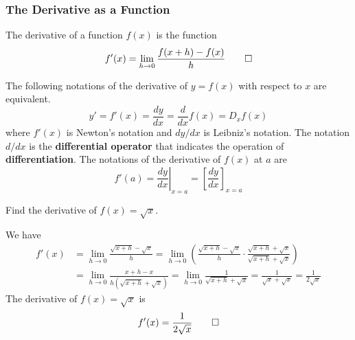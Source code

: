 \subsubsection{The Derivative as a Function}
\begin{definition}
    The derivative of a function \(f(x)\) is the function
    \[f'(x)=\lim_{h\to 0}\frac{f(x+h)-f(x)}{h}\qedhere\]
\end{definition}
The following notations of the derivative of \(y=f(x)\) with respect to \(x\) are
equivalent.
\[y'=f'(x)=\frac{dy}{dx}=\frac{d}{dx}f(x)=D_x f(x)\]
where \(f'(x)\) is Newton's notation and \(dy/dx\) is Leibniz's notation.
The notation \(d/dx\) is the \textbf{differential operator} that indicates the
operation of \textbf{differentiation}.
The notations of the derivative of \(f(x)\) at \(a\) are
\[f'(a)=\left.\frac{dy}{dx}\right|_{x=a}=\left[\frac{dy}{dx}\right]_{x=a}\]
\begin{problem}
    Find the derivative of \(f(x)=\sqrt{x}\).
\end{problem}
\begin{solution}
    We have
    \begin{align*}
        f'(x)&=\lim_{h\to 0}\frac{\sqrt{x+h}-\sqrt{x}}{h}=\lim_{h\to 0}
        \left(\frac{\sqrt{x+h}-\sqrt{x}}{h}\cdot
        \frac{\sqrt{x+h}+\sqrt{x}}{\sqrt{x+h}+\sqrt{x}}\right) \\
        &=\lim_{h\to 0}\frac{x+h-x}{h(\sqrt{x+h}+\sqrt{x})}
        =\lim_{h\to 0}\frac{1}{\sqrt{x+h}+\sqrt{x}}=\frac{1}{\sqrt{x}+\sqrt{x}}
        =\frac{1}{2\sqrt{x}}
    \end{align*}
    The derivative of \(f(x)=\sqrt{x}\) is \[f'(x)=\frac{1}{2\sqrt{x}}\qedhere\]
\end{solution}

